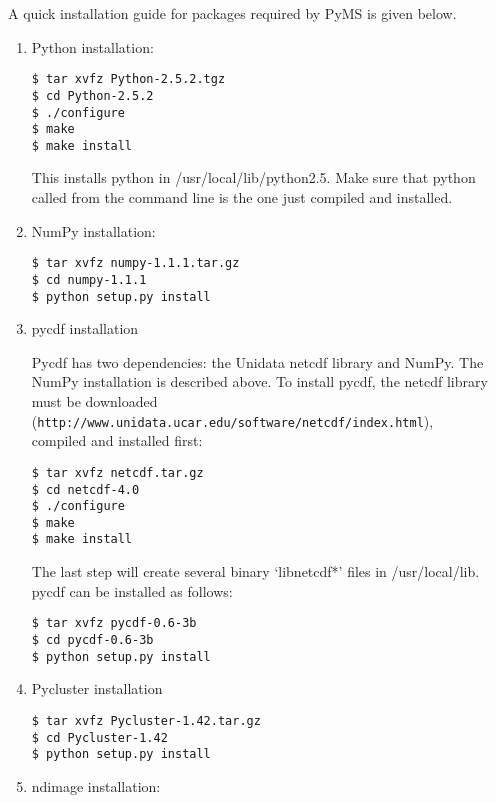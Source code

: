A quick installation guide for packages required by PyMS is given below.

\begin{enumerate}

\item Python installation:

\begin{verbatim}
$ tar xvfz Python-2.5.2.tgz
$ cd Python-2.5.2
$ ./configure
$ make
$ make install
\end{verbatim}

\noindent
This installs python in /usr/local/lib/python2.5.  Make sure that python called
from the command line is the one just compiled and installed.

\item NumPy installation:

\begin{verbatim}
$ tar xvfz numpy-1.1.1.tar.gz
$ cd numpy-1.1.1
$ python setup.py install
\end{verbatim}

\item pycdf installation

Pycdf has two dependencies: the Unidata netcdf library and NumPy. The NumPy
installation is described above. To install pycdf, the netcdf library must
be downloaded\\
({\tt http://www.unidata.ucar.edu/software/netcdf/index.html}),\\
compiled and installed first:

\begin{verbatim}
$ tar xvfz netcdf.tar.gz
$ cd netcdf-4.0
$ ./configure
$ make
$ make install
\end{verbatim}

The last step will create several binary `libnetcdf*' files in /usr/local/lib.
pycdf can be installed as follows:

\begin{verbatim}
$ tar xvfz pycdf-0.6-3b
$ cd pycdf-0.6-3b
$ python setup.py install
\end{verbatim}

\item Pycluster installation

\begin{verbatim}
$ tar xvfz Pycluster-1.42.tar.gz
$ cd Pycluster-1.42
$ python setup.py install
\end{verbatim}

\item ndimage installation:


\end{enumerate}
